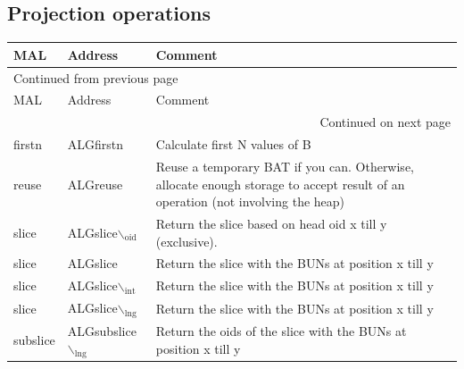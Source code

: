 \documentclass[11pt]{article}
\begin{document}
\subsection{Projection operations}
\label{sec:org7af1bf5}
\begin{longtable}{|l|l|p{10cm}|}
\hline
MAL & Address & Comment\\
\hline
\endfirsthead
\multicolumn{3}{l}{Continued from previous page} \\
\hline

MAL & Address & Comment \\

\hline
\endhead
\hline\multicolumn{3}{r}{Continued on next page} \\
\endfoot
\endlastfoot
\hline
firstn & ALGfirstn & Calculate first N values of B\\
\hline
reuse & ALGreuse & Reuse a temporary BAT if you can. Otherwise, allocate enough storage to accept result of an	operation (not involving the heap)\\
\hline
slice & ALGslice$\backslash$\(_{\text{oid}}\) & Return the slice based on head oid x till y (exclusive).\\
\hline
slice & ALGslice & Return the slice with the BUNs at position x till y\\
\hline
slice & ALGslice$\backslash$\(_{\text{int}}\) & Return the slice with the BUNs at position x till y\\
\hline
slice & ALGslice$\backslash$\(_{\text{lng}}\) & Return the slice with the BUNs at position x till y\\
\hline
subslice & ALGsubslice$\backslash$\(_{\text{lng}}\) & Return the oids of the slice with the BUNs at position x till y\\
\hline
\end{longtable}
\end{document}
